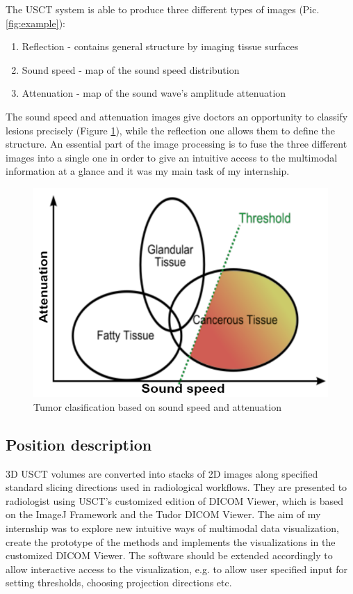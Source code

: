 \documentclass[english]{article}
\begin{document}
The USCT system is able to produce three different types of images (Pic. \ref{fig:example}):

\begin{enumerate}
\item Reflection - contains general structure by imaging tissue surfaces
\item Sound speed - map of the sound speed distribution
\item Attenuation - map of the sound wave's amplitude attenuation
\end{enumerate}

The sound speed and attenuation images give doctors an opportunity to classify lesions precisely  (Figure \ref{fig:nicol}), while the reflection one allows them to define the structure. An essential part of the image processing is to fuse the three different images into a single one in order to give an intuitive access to the multimodal information at a glance and it was my main task of my internship. 

\begin{figure}[H]
\centerline{\includegraphics[scale=0.4]{internship_report/nicol}}
\caption{Tumor clasification based on sound speed and attenuation\label{fig:nicol} \cite{nicol}}
\end{figure}
\subsection{Position description}

3D USCT volumes are converted into stacks of 2D images along specified standard slicing directions used in radiological workflows. They are presented to radiologist using USCT's customized edition of DICOM Viewer, which is based on the ImageJ Framework and the Tudor DICOM Viewer. The aim of my internship was to explore new intuitive ways of multimodal data visualization, create the prototype of the methods and implements the visualizations in the customized DICOM Viewer. The software should be extended accordingly to allow interactive access to the visualization, e.g. to allow user specified input for setting thresholds, choosing projection directions etc.\cite{p}\\
\end{document}
